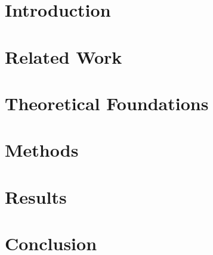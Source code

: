 \documentclass[11pt]{article}
\begin{document}
\maketitle

\begin{abstract}
\end{abstract}

\section{Introduction}

\section{Related Work}

\section{Theoretical Foundations}

\section{Methods}

\section{Results}

\section{Conclusion}

\begin{thebibliography}{10}
    \raggedright
\end{thebibliography}
\end{document}
